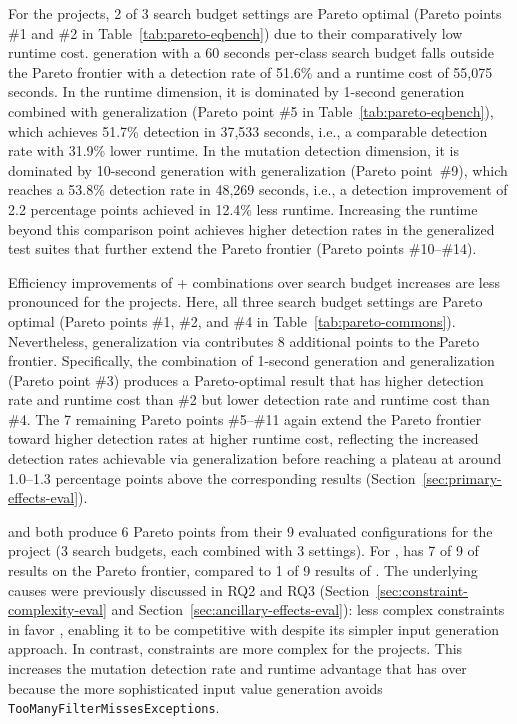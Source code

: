 For the \DatasetsEqBenchEs{} projects,
2 of 3 \ToolEvoSuite{} search budget settings are Pareto optimal
(Pareto points \#1 and \#2 in Table~\ref{tab:pareto-eqbench})
due to their comparatively low runtime cost.
\ToolEvoSuite{} generation with a 60 seconds per-class search budget
falls outside the Pareto frontier with a 
detection rate of 51.6\% and a runtime cost of 55,075 seconds.
In the runtime dimension,
it is dominated by 1-second \ToolEvoSuite{} generation
combined with \VariantNaiveB{} generalization
(Pareto point \#5 in Table~\ref{tab:pareto-eqbench}),
which achieves 51.7\% detection in 37,533 seconds,
i.e., a comparable detection rate with 31.9\% lower runtime.
In the mutation detection dimension,
it is dominated by 10-second \ToolEvoSuite{} generation
with \VariantImprovedC{} generalization (Pareto point~\#9),
which reaches a 53.8\% detection rate in 48,269 seconds, i.e.,
a detection improvement of 2.2 percentage points achieved in 12.4\% less runtime.
Increasing the runtime beyond this comparison point achieves higher
detection rates in the generalized test suites
that further extend the Pareto frontier (Pareto points \#10--\#14).

Efficiency improvements of \ToolEvoSuite{} + \ToolTeralizer{} combinations
over \ToolEvoSuite{} search budget increases
are less pronounced for the \DatasetsCommonsEs{} projects.
Here, all three \ToolEvoSuite{} search budget settings are Pareto optimal
(Pareto points \#1, \#2, and \#4 in Table~\ref{tab:pareto-commons}).
Nevertheless, generalization via \ToolTeralizer{} contributes
8 additional points to the Pareto frontier.
Specifically, the combination of 1-second \ToolEvoSuite{} generation
and \VariantImprovedA{} generalization (Pareto point \#3)
produces a Pareto-optimal result
that has higher detection rate and runtime cost than \#2
but lower detection rate and runtime cost than \#4.
The 7 remaining Pareto points \#5--\#11 again extend the Pareto frontier
toward higher detection rates at higher runtime cost,
reflecting the increased detection rates achievable via generalization
before reaching a plateau at around
1.0--1.3 percentage points above the corresponding \ToolEvoSuite{} results
(Section~\ref{sec:primary-effects-eval}).

\VariantNaive{} and \VariantImproved{}
both produce
6 Pareto points from their 9 evaluated configurations
for the \DatasetsEqBenchEs{} project
(3 \ToolEvoSuite{} search budgets, each combined with 3 \tries{} settings).
For \DatasetsCommonsEs{},
\VariantImproved{} has 7 of 9 of results on the Pareto frontier,
compared to 1 of 9 results of \VariantNaive{}.
The underlying causes were previously discussed in RQ2 and RQ3
(Section~\ref{sec:constraint-complexity-eval} and Section~\ref{sec:ancillary-effects-eval}):
less complex constraints in \DatasetsEqBenchEs{}
favor \VariantNaive{}, enabling it to be competitive with
\VariantImproved{} despite its simpler input generation approach.
In contrast, constraints are more complex for the \DatasetsCommonsEs{} projects.
This increases the mutation detection rate and runtime advantage that
\VariantImproved{} has over \VariantNaive{}
because the more sophisticated input value generation avoids
\texttt{Too\-Many\-Filter\-Misses\-Exceptions}.

